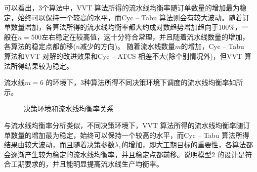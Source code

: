 可以看出，$3$个算法中，VVT 算法所得的流水线均衡率随订单数量的增加最为稳定，始终可以保持一个较高的水平，而Cyc -- Tabu 算法则会有较大波动。随着订单数量增加，各算法所得的流水线均衡率都大约成对数趋势增加趋向于$100\%$，一般在$n = 500$左右稳定在较高值，这十分符合常理，并且随着流水线数量的增加，各算法的稳定点都前移($n$减少的方向)。
随着流水线数量$m$的增加，Cyc -- Tabu 算法和VVT 对解的改进效果和Cyc -- ATCS 相差不大(除个别情况外)，但VVT 算法所得结果较为稳定。

流水线$m = 6$ 的环境下，$3$种算法所得不同决策环境下调度的流水线均衡率如所示。
\begin{figure}
\centering
{}
\caption{决策环境和流水线均衡率关系}\label{fig:decisionvsrate}
\end{figure}

与流水线均衡率分析类似，不同决策环境下，VVT 算法所得的流水线均衡率随订单数量的增加最为稳定，始终可以保持一个较高的水平，而Cyc -- Tabu 算法所得结果由较大波动，而且随着决策参数$\lambda_1$的增加，即大工期目标的重要性，各算法都会逐渐产生较为稳定的流水线均衡率，并且稳定点都前移。说明模型2 的设计是符合工期要求的，并且能明显提高流水线生产均衡率。

